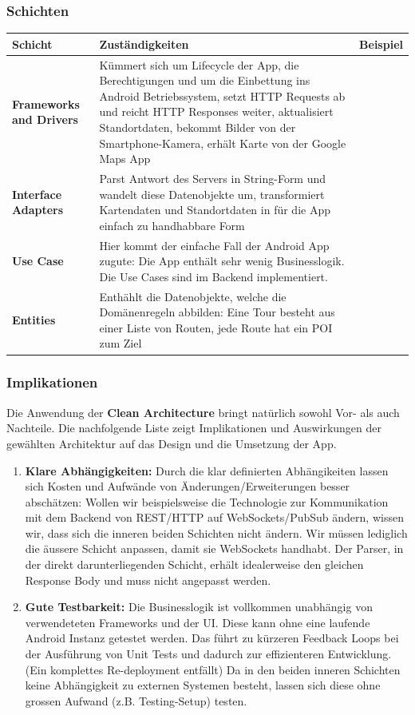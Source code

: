 \documentclass[a4paper,10pt,xetex]{article}
\begin{document}
\subsubsection{Schichten}\label{layerstravelbuddy}
\begin{longtabu} to \textwidth { | l | X[l] |  }
\hline
\textbf{Schicht} & \textbf{Zuständigkeiten} & \textbf{Beispiel} \\\hline
\endhead
\textbf{Frameworks and Drivers} & Kümmert sich um Lifecycle der App, die Berechtigungen und um die Einbettung ins Android Betriebssystem, setzt HTTP Requests ab und reicht HTTP Responses weiter, aktualisiert Standortdaten, bekommt Bilder von der Smartphone-Kamera, erhält Karte von der Google Maps App\\\hline
\textbf{Interface Adapters} & Parst Antwort des Servers in String-Form und wandelt diese Datenobjekte um, transformiert Kartendaten und Standortdaten in für die App einfach zu handhabbare Form\\\hline
\textbf{Use Case} & Hier kommt der einfache Fall der Android App zugute: Die App enthält sehr wenig Businesslogik. Die Use Cases sind im Backend implementiert.\\\hline
\textbf{Entities} & Enthählt die Datenobjekte, welche die Domänenregeln abbilden: Eine Tour besteht aus einer Liste von Routen, jede Route hat ein POI zum Ziel\\\hline
\end{longtabu}

\subsubsection{Implikationen}\label{implications}
Die Anwendung der \textbf{Clean Architecture} bringt natürlich sowohl Vor- als auch Nachteile. Die nachfolgende Liste zeigt Implikationen und Auswirkungen der gewählten Architektur auf das Design und die Umsetzung der App. 
\begin{enumerate}
\item \textbf{Klare Abhängigkeiten:} Durch die klar definierten Abhängikeiten lassen sich Kosten und Aufwände von Änderungen/Erweiterungen besser abschätzen: Wollen wir beispielsweise die Technologie zur Kommunikation mit dem Backend von REST/HTTP auf WebSockets/PubSub ändern, wissen wir, dass sich die inneren beiden Schichten nicht ändern. Wir müssen lediglich die äussere Schicht anpassen, damit sie WebSockets handhabt. Der Parser, in der direkt darunterliegenden Schicht, erhält idealerweise den gleichen Response Body und muss nicht angepasst werden. 
\item \textbf{Gute Testbarkeit:} Die Businesslogik ist vollkommen unabhängig von verwendeteten Frameworks und der UI. Diese kann ohne eine laufende Android Instanz getestet werden. Das führt zu kürzeren Feedback Loops bei der Ausführung von Unit Tests und dadurch zur effizienteren Entwicklung. (Ein komplettes Re-deployment entfällt) 
Da in den beiden inneren Schichten keine Abhängigkeit zu externen Systemen besteht, lassen sich diese ohne grossen Aufwand (z.B. Testing-Setup) testen.
\end{enumerate}
\end{document}

